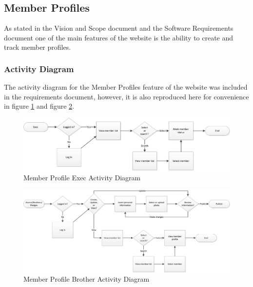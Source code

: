 \documentclass{article}
\begin{document}
\subsection{Member Profiles}

As stated in the Vision and Scope document and the Software Requirements document one of the main features of the website is the ability to create and track member profiles.

\subsubsection{Activity Diagram}
The activity diagram for the Member Profiles feature of the website was included in the requirements document, however, it is also reproduced here for convenience in figure \ref{fig:memberProfileExecActivityDiagram} and  figure \ref{fig:memberProfileBrotherActivityDiagram}.

\FloatBarrier
\begin{figure}
\centering
\includegraphics[scale=.65]{img/activityDiagrams/memberProfileActivity1}
\caption{Member Profile Exec Activity Diagram}
\label{fig:memberProfileExecActivityDiagram}
\end{figure}
\FloatBarrier

\FloatBarrier
\begin{figure}
\centering
\includegraphics[scale=.65]{img/activityDiagrams/memberProfileActivity2}
\caption{Member Profile Brother Activity Diagram}
\label{fig:memberProfileBrotherActivityDiagram}
\end{figure}
\FloatBarrier
\end{document}
